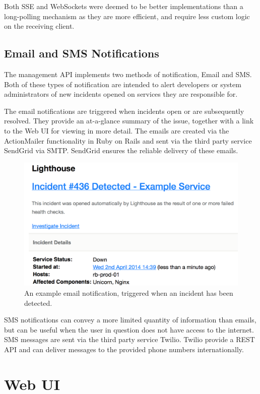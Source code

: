 \documentclass{cshonours}
\begin{document}
Both SSE and WebSockets were deemed to be better implementations than a long-polling mechanism as they are more efficient, and require less custom logic on the receiving client.

\pagebreak
\subsection{Email and SMS Notifications}

The management API implements two methods of notification, Email and SMS. Both of these types of notification are intended to alert developers or system administrators of new incidents opened on services they are responsible for.

The email notifications are triggered when incidents open or are subsequently resolved. They provide an at-a-glance summary of the issue, together with a link to the Web UI for viewing in more detail. The emails are created via the ActionMailer functionality in Ruby on Rails and sent via the third party service SendGrid via SMTP. SendGrid ensures the reliable delivery of these emails.

\begin{figure}[h]
\includegraphics[scale=0.6]{email.png}
\caption{An example email notification, triggered when an incident has been detected.}
\end{figure}

SMS notifications can convey a more limited quantity of information than emails, but can be useful when the user in question does not have access to the internet. SMS messages are sent via the third party service Twilio. Twilio provide a REST API and can deliver messages to the provided phone numbers internationally.

\pagebreak
\section{Web UI}
\end{document}
